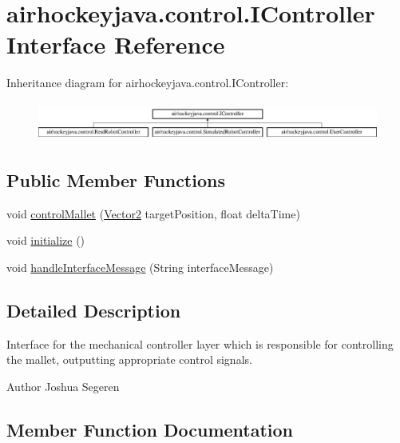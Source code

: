 \hypertarget{interfaceairhockeyjava_1_1control_1_1_i_controller}{}\section{airhockeyjava.\+control.\+I\+Controller Interface Reference}
\label{interfaceairhockeyjava_1_1control_1_1_i_controller}
Inheritance diagram for airhockeyjava.\+control.\+I\+Controller\+:\begin{figure}[H]
\begin{center}
\leavevmode
\includegraphics[height=1.291811cm]{interfaceairhockeyjava_1_1control_1_1_i_controller}
\end{center}
\end{figure}
\subsection*{Public Member Functions}
\begin{DoxyCompactItemize}
\item 
void \hyperlink{interfaceairhockeyjava_1_1control_1_1_i_controller_ad70e45ec858fa82506e8dcf166961e43}{control\+Mallet} (\hyperlink{classairhockeyjava_1_1util_1_1_vector2}{Vector2} target\+Position, float delta\+Time)
\item 
void \hyperlink{interfaceairhockeyjava_1_1control_1_1_i_controller_a5cff7c5681c4bb29e631cebe77e02a93}{initialize} ()
\item 
void \hyperlink{interfaceairhockeyjava_1_1control_1_1_i_controller_a734e16cfbd13ec095a71c7dcd60b2e2c}{handle\+Interface\+Message} (String interface\+Message)
\end{DoxyCompactItemize}


\subsection{Detailed Description}
Interface for the mechanical controller layer which is responsible for controlling the mallet, outputting appropriate control signals.

\begin{DoxyAuthor}{Author}
Joshua Segeren 
\end{DoxyAuthor}


\subsection{Member Function Documentation}
\hypertarget{interfaceairhockeyjava_1_1control_1_1_i_controller_ad70e45ec858fa82506e8dcf166961e43}{}
